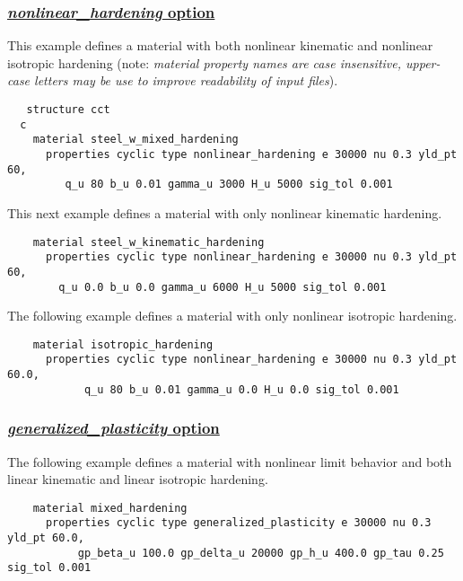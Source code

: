 \documentclass[11pt]{report}
\numberwithin{equation}{section}
\newcommand{\bsf } [1]{\textrm{\textit{#1}}\xspace}
\begin{document}
\subsubsection{\underline{\bsf{nonlinear\_hardening} option}}

This example defines a material with both nonlinear kinematic and nonlinear isotropic
hardening (note: \textit{material property names are case insensitive, upper-case letters
may be use to improve readability of input files}).

\small
\begin{verbatim}
   structure cct
  c
    material steel_w_mixed_hardening
      properties cyclic type nonlinear_hardening e 30000 nu 0.3 yld_pt 60,
         q_u 80 b_u 0.01 gamma_u 3000 H_u 5000 sig_tol 0.001
 \end{verbatim}
 \normalsize
 
\noindent This next example defines a material with only nonlinear kinematic hardening.
 \small
 \begin{verbatim}
    material steel_w_kinematic_hardening
      properties cyclic type nonlinear_hardening e 30000 nu 0.3 yld_pt 60,
        q_u 0.0 b_u 0.0 gamma_u 6000 H_u 5000 sig_tol 0.001
 \end{verbatim}
 \normalsize
 
\noindent The following example defines a material with only nonlinear isotropic hardening.
 \small
 \begin{verbatim}
    material isotropic_hardening
      properties cyclic type nonlinear_hardening e 30000 nu 0.3 yld_pt 60.0, 
            q_u 80 b_u 0.01 gamma_u 0.0 H_u 0.0 sig_tol 0.001
 \end{verbatim}
 \normalsize



\subsubsection{\underline{\bsf{generalized\_plasticity} option}}

The following example defines a material with nonlinear limit behavior 
and both linear kinematic and linear isotropic hardening.

\small
 \begin{verbatim}
    material mixed_hardening
      properties cyclic type generalized_plasticity e 30000 nu 0.3 yld_pt 60.0,
           gp_beta_u 100.0 gp_delta_u 20000 gp_h_u 400.0 gp_tau 0.25 sig_tol 0.001
\end{verbatim}
 \normalsize
 
\end{document}
